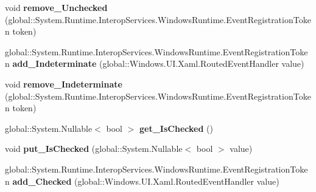 \begin{DoxyCompactItemize}
void {\bfseries remove\+\_\+\+Unchecked} (global\+::\+System.\+Runtime.\+Interop\+Services.\+Windows\+Runtime.\+Event\+Registration\+Token token)
\item 
\mbox{\label{interface_windows_1_1_u_i_1_1_xaml_1_1_controls_1_1_primitives_1_1_i_toggle_button_aa819460ff16c0555139f41a6ff334a9b}} 
global\+::\+System.\+Runtime.\+Interop\+Services.\+Windows\+Runtime.\+Event\+Registration\+Token {\bfseries add\+\_\+\+Indeterminate} (global\+::\+Windows.\+U\+I.\+Xaml.\+Routed\+Event\+Handler value)
\item 
\mbox{\label{interface_windows_1_1_u_i_1_1_xaml_1_1_controls_1_1_primitives_1_1_i_toggle_button_ab448af06ccc5e4eaca742a2ef9c88b2b}} 
void {\bfseries remove\+\_\+\+Indeterminate} (global\+::\+System.\+Runtime.\+Interop\+Services.\+Windows\+Runtime.\+Event\+Registration\+Token token)
\item 
\mbox{\label{interface_windows_1_1_u_i_1_1_xaml_1_1_controls_1_1_primitives_1_1_i_toggle_button_ab2f2c05633de2713aaa610f12657e543}} 
global\+::\+System.\+Nullable$<$ bool $>$ {\bfseries get\+\_\+\+Is\+Checked} ()
\item 
\mbox{\label{interface_windows_1_1_u_i_1_1_xaml_1_1_controls_1_1_primitives_1_1_i_toggle_button_afaace15befe9dea02eb0d81c76b8ff32}} 
void {\bfseries put\+\_\+\+Is\+Checked} (global\+::\+System.\+Nullable$<$ bool $>$ value)
\item 
\mbox{\label{interface_windows_1_1_u_i_1_1_xaml_1_1_controls_1_1_primitives_1_1_i_toggle_button_a9579b9435c7ea6041a3d25d96e4e02b6}} 
global\+::\+System.\+Runtime.\+Interop\+Services.\+Windows\+Runtime.\+Event\+Registration\+Token {\bfseries add\+\_\+\+Checked} (global\+::\+Windows.\+U\+I.\+Xaml.\+Routed\+Event\+Handler value)
\item 
\mbox{\label{interface_windows_1_1_u_i_1_1_xaml_1_1_controls_1_1_primitives_1_1_i_toggle_button_afa5ff3c678236b48b302c60a17489ad3}} 

\end{DoxyCompactItemize}
